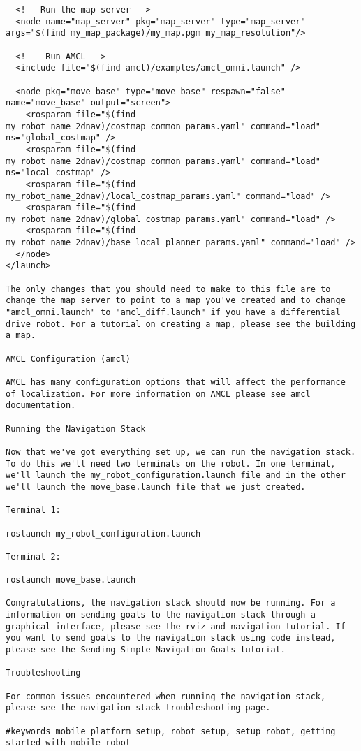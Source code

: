 \begin{verbatim}
  <!-- Run the map server -->
  <node name="map_server" pkg="map_server" type="map_server" args="$(find my_map_package)/my_map.pgm my_map_resolution"/>

  <!--- Run AMCL -->
  <include file="$(find amcl)/examples/amcl_omni.launch" />

  <node pkg="move_base" type="move_base" respawn="false" name="move_base" output="screen">
    <rosparam file="$(find my_robot_name_2dnav)/costmap_common_params.yaml" command="load" ns="global_costmap" />
    <rosparam file="$(find my_robot_name_2dnav)/costmap_common_params.yaml" command="load" ns="local_costmap" />
    <rosparam file="$(find my_robot_name_2dnav)/local_costmap_params.yaml" command="load" />
    <rosparam file="$(find my_robot_name_2dnav)/global_costmap_params.yaml" command="load" />
    <rosparam file="$(find my_robot_name_2dnav)/base_local_planner_params.yaml" command="load" />
  </node>
</launch>

The only changes that you should need to make to this file are to change the map server to point to a map you've created and to change "amcl_omni.launch" to "amcl_diff.launch" if you have a differential drive robot. For a tutorial on creating a map, please see the building a map.

AMCL Configuration (amcl)

AMCL has many configuration options that will affect the performance of localization. For more information on AMCL please see amcl documentation.

Running the Navigation Stack

Now that we've got everything set up, we can run the navigation stack. To do this we'll need two terminals on the robot. In one terminal, we'll launch the my_robot_configuration.launch file and in the other we'll launch the move_base.launch file that we just created.

Terminal 1:

roslaunch my_robot_configuration.launch

Terminal 2:

roslaunch move_base.launch

Congratulations, the navigation stack should now be running. For a information on sending goals to the navigation stack through a graphical interface, please see the rviz and navigation tutorial. If you want to send goals to the navigation stack using code instead, please see the Sending Simple Navigation Goals tutorial.

Troubleshooting

For common issues encountered when running the navigation stack, please see the navigation stack troubleshooting page.

#keywords mobile platform setup, robot setup, setup robot, getting started with mobile robot 
\end{verbatim}

